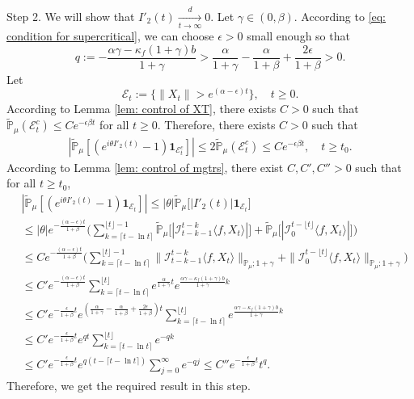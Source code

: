 \documentclass[12pt]{amsart}
\theoremstyle{plain}
\theoremstyle{definition}
\numberwithin{equation}{section}
\begin{document}
	Step 2. 
	We will show that $I'_2(t)\xrightarrow[t\to \infty]{d} 0$. 
	Let $\gamma \in (0,\beta)$.
	According to \eqref{eq: condition for supercritical}, we can choose $\epsilon > 0$ small enough so that
\[
	q:= - \frac{\alpha \gamma-\kappa_f(1+\gamma)b}{1+\gamma} 
	> \frac{\alpha}{1+\gamma}-\frac{\alpha}{1+\beta} + \frac{2\epsilon}{1+\beta} > 0.
\]
	Let 
\[
	\mathcal E_t
	:=\{\|X_t\|>e^{(\alpha-\epsilon )t}\},
	\quad t\geq 0.
\]
	According to Lemma \ref{lem: control of XT}, there exists
	$C>0$ such that  $\mathbb{\tilde{P}}_{\mu}(\mathcal E_t^c)\leq C e^{-\epsilon \beta t}$
	for all $t\geq 0$.
	Therefore, there exists $C>0$ such that
\begin{align}
    |\mathbb{\tilde{P}}_{\mu}[(e^{i\theta I'_2(t)}-1)\mathbf{1}_{\mathcal{E}^{c}_t}]|
    \leq 2\mathbb{\tilde{P}}_{\mu}(\mathcal{E}^c_t)\leq Ce^{-\epsilon \beta t},
    \quad t\geq t_0.
\end{align}
	According to Lemma \ref{lem: control of mgtrs}, there exist $C,C',C''>0$ such that for all
	$t\ge t_0$, 
\begin{align*}
    &|\mathbb{\tilde{P}}_{\mu} [ (e^{i\theta I'_2(t)}-1)\mathbf{1}_{\mathcal{E}_t}]|
    \leq |\theta| \mathbb{\tilde{P}}_{\mu} \big[ |I'_2(t)|\mathbf{1}_{\mathcal{E}_t}\big]
    \\&\leq|\theta| e^{-\frac{(\alpha - \epsilon )t}{1+\beta}} \Big(\sum_{k=\lceil t-\ln t \rceil}^{\lfloor t \rfloor - 1}\mathbb{\tilde{P}}_{\mu}\big[| \mathcal{I}_{t-k-1}^{t-k}\langle f,X_t\rangle|\big] + \mathbb{\tilde{P}}_{\mu}\big[| \mathcal{I}_{0}^{t-\lfloor t\rfloor}\langle f,X_t\rangle|\big]\Big)
    \\& \leq C  e^{-\frac{(\alpha - \epsilon )t}{1+\beta}} \Big(\sum_{k=\lceil t-\ln t \rceil}^{\lfloor t \rfloor - 1}\|\mathcal{I}_{t-k-1}^{t-k}\langle f,X_t\rangle\|_{\mathbb P_\mu; 1+\gamma} + \|\mathcal I_0^{t-\lfloor t \rfloor} \langle f, X_t\rangle\|_{\mathbb P_\mu;1+\gamma}\Big)
    \\ &\leq C'  e^{-\frac{(\alpha - \epsilon )t}{1+\beta}} \sum_{k=\lceil t-\ln t \rceil}^{\lfloor t \rfloor}e^{\frac{\alpha}{1+\gamma}t}e^{\frac{\alpha\gamma-\kappa_f(1+\gamma)b}{1+\gamma}k}\\
    &\leq C'  e^{-\frac{\epsilon}{1+\beta} t}e^{(\frac{\alpha }{1+\gamma}-\frac{\alpha }{1+\beta} + \frac{2\epsilon}{1+\beta})t} \sum_{k=\lceil t-\ln t \rceil}^{\lfloor t \rfloor}e^{\frac{\alpha\gamma-\kappa_f(1+\gamma)b}{1+\gamma}k}\\
    &\leq C'  e^{-\frac{\epsilon}{1+\beta} t} e^{qt} \sum_{k=\lceil t-\ln t \rceil}^{\lfloor t \rfloor}e^{-qk}\\
    &\leq C'  e^{-\frac{\epsilon}{1+\beta} t} e^{q(t - \lceil t - \ln t\rceil)} \sum_{j=0}^{\infty}e^{-qj}\leq C'' e^{-\frac{\epsilon}{1+\beta} t} t^q.
\end{align*}
	Therefore, we get the required result in this step.
\end{document}
